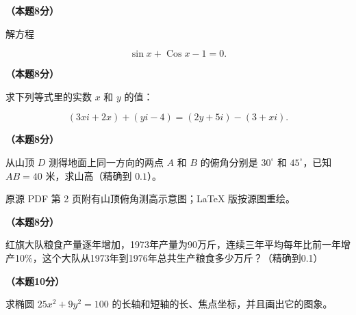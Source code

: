 \begin{question}
\textbf{（本题8分）} 

解方程

\nopagebreak[4]
\[
\sin x+\operatorname{Cos}x-1=0.
\]

\end{question}
\begin{question}
\textbf{（本题8分）} 

求下列等式里的实数 $x$ 和 $y$ 的值：

\nopagebreak[4]
\[
(3xi+2x)+(yi-4)=(2y+5i)-(3+xi).
\]

\Needspace{0.4\textheight}
\end{question}
\begin{question}
\textbf{（本题8分）} 

从山顶 $D$ 测得地面上同一方向的两点 $A$ 和 $B$ 的俯角分别是 $30^\circ$ 和 $45^\circ$，已知 $AB=40$ 米，求山高（精确到 $0.1$）。

\begin{gktip}
原源 PDF 第 2 页附有山顶俯角测高示意图；LaTeX 版按源图重绘。
\end{gktip}
\nopagebreak[4]
\begin{center}\end{center}
\nopagebreak[4]
\end{question}
\begin{question}
\textbf{（本题8分）} 

红旗大队粮食产量逐年增加，1973年产量为90万斤，连续三年平均每年比前一年增产10\%，这个大队从1973年到1976年总共生产粮食多少万斤？（精确到0.1）

\end{question}
\begin{question}
\textbf{（本题10分）} 

求椭圆 $25x^2+9y^2=100$ 的长轴和短轴的长、焦点坐标，并且画出它的图象。

\end{question}
